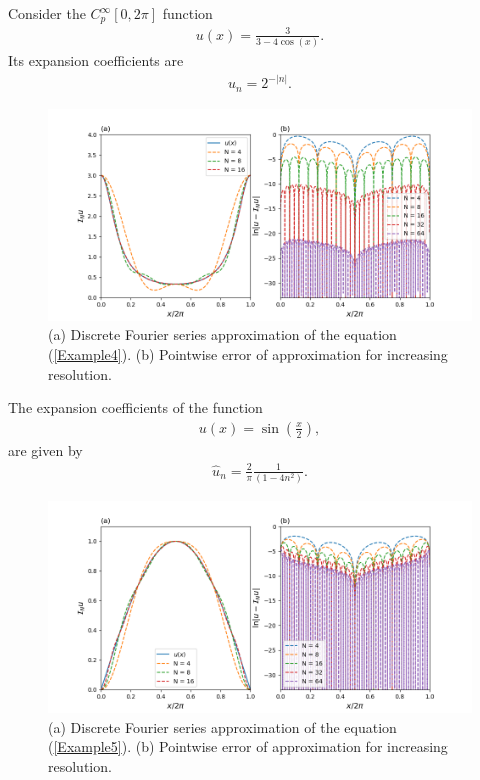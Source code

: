 	\begin{example}
	    Consider the $C^{\infty}_p [0, 2 \pi]$ function
    	\begin{align}
    		\label{Example4}
    	    u(x) = \frac{3}{3 - 4 \cos(x)}.
    	\end{align}
    	Its expansion coefficients are
    	\begin{align*}
    	     \hat{u}_{n} = 2^{-|n|}.
    	\end{align*}
    	\begin{figure}[H]
        \includegraphics[width=\textwidth]{Figures/example27.png}
        \caption{(a) Discrete Fourier series approximation of the equation (\ref{Example4}). (b) Pointwise error of approximation for increasing resolution.}
        \label{fig3}
        \end{figure}
	\end{example} 
	
	\begin{example}
	    The expansion coefficients of the function
    	\begin{align}
    		\label{Example5}
    	    u(x) = \sin(\frac{x}{2}),
    	\end{align}
   		are given by
    	\begin{align*}
    	     \hat{u}_{n} = \frac{2}{\pi} \frac{1}{(1 - 4n^2)}.
    	\end{align*}
    	\begin{figure}[H]
        \includegraphics[width=\textwidth]{Figures/example28.png}
        \caption{(a) Discrete Fourier series approximation of the equation (\ref{Example5}). (b) Pointwise error of approximation for increasing resolution.}
        \label{fig4}
        \end{figure}
	\end{example} 
	
